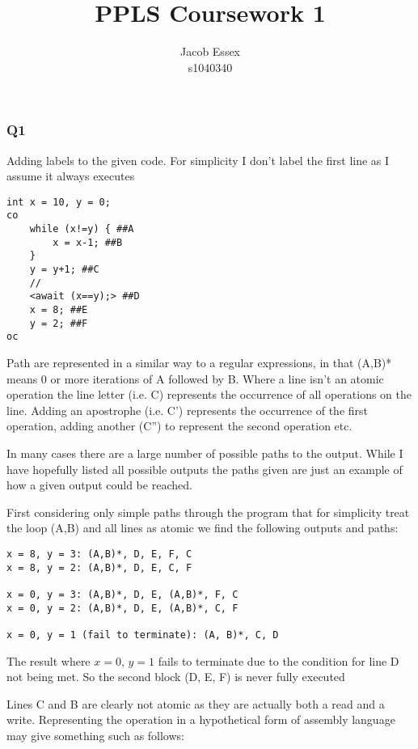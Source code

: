 \documentclass[11pt,a4paper]{article}
\begin{document}
\title{PPLS Coursework 1}
\author{Jacob Essex\\s1040340}
\date{}
\maketitle

\subsubsection*{Q1}

Adding labels to the given code. For simplicity I don't label the first line as I assume it always executes

\begin{verbatim}
int x = 10, y = 0;
co
    while (x!=y) { ##A
        x = x-1; ##B
    }
    y = y+1; ##C
    //
    <await (x==y);> ##D
    x = 8; ##E
    y = 2; ##F
oc
\end{verbatim}

Path are represented in a similar way to a regular expressions, in that (A,B)* means 0
or more iterations of A followed by B. Where a line isn't an atomic
operation the line letter (i.e. C) represents the occurrence of all operations on the line. Adding an apostrophe (i.e. C') represents the occurrence
of the first operation, adding another (C'') to represent the second operation etc.

In many cases there are a large number of possible paths to the output.
While I have hopefully listed all possible outputs the paths given are
just an example of how a given output could be reached.

First considering only simple paths through the program that for simplicity treat the
loop (A,B) and all lines as atomic we find the following outputs and
paths:

\begin{verbatim}
x = 8, y = 3: (A,B)*, D, E, F, C
x = 8, y = 2: (A,B)*, D, E, C, F

x = 0, y = 3: (A,B)*, D, E, (A,B)*, F, C
x = 0, y = 2: (A,B)*, D, E, (A,B)*, C, F

x = 0, y = 1 (fail to terminate): (A, B)*, C, D
\end{verbatim}

The result where $x = 0$, $y = 1$ fails to terminate due to the condition
for line D not being met. So the second block (D, E, F) is never fully executed

Lines C and B are clearly not atomic as they are actually both a read
and a write. Representing the operation in a hypothetical form of assembly language
may give something such as follows:
\end{document}

